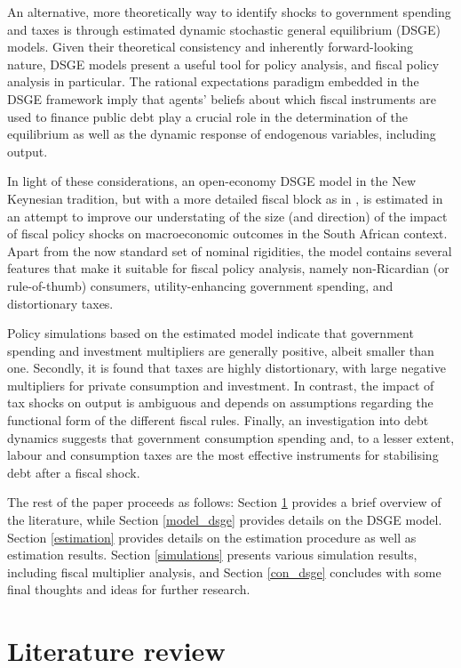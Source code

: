 \documentclass[a4paper,11pt]{article}
\numberwithin{equation}{section}
\begin{document}
	An alternative, more theoretically way to identify shocks to government spending and taxes is through estimated dynamic stochastic general equilibrium (DSGE) models. Given their theoretical consistency and inherently forward-looking nature, DSGE models present a useful tool for policy analysis, and fiscal policy analysis in particular. The rational expectations paradigm embedded in the DSGE framework imply that agents' beliefs about which fiscal instruments are used to finance public debt play a crucial role in the determination of the equilibrium as well as the dynamic response of endogenous variables, including output. 
	
	In light of these considerations, an open-economy DSGE model in the New Keynesian tradition, but with a more detailed fiscal block as in \cite{coenen2013}, is estimated in an attempt to improve our understating of the size (and direction) of the impact of fiscal policy shocks on macroeconomic outcomes in the South African context. Apart from the now standard set of nominal rigidities, the model contains several features that make it suitable for fiscal policy analysis, namely non-Ricardian (or rule-of-thumb) consumers, utility-enhancing government spending, and distortionary taxes.
	
	Policy simulations based on the estimated model indicate that government spending and investment multipliers are generally positive, albeit smaller than one. Secondly, it is found that taxes are highly distortionary, with large negative multipliers for private consumption and investment. In contrast, the impact of tax shocks on output is ambiguous and depends on assumptions regarding the functional form of the different fiscal rules. Finally, an investigation into debt dynamics suggests that government consumption spending and, to a lesser extent, labour and consumption taxes are the most effective instruments for stabilising debt after a fiscal shock. 
	
	The rest of the paper proceeds as follows: Section \ref{lit_rev} provides a brief overview of the literature, while Section \ref{model_dsge} provides details on the DSGE model. Section \ref{estimation} provides details on the estimation procedure as well as estimation results. Section \ref{simulations} presents various simulation results, including fiscal multiplier analysis, and Section \ref{con_dsge} concludes with some final thoughts and ideas for further research.
	
	\section{Literature review} \label{lit_rev}
	
\end{document}
